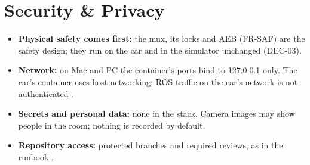 \documentclass[11pt,a4paper]{article}
\begin{document}
\section{Security \& Privacy}
\begin{itemize}
  \item \textbf{Physical safety comes first:} the mux, its locks and AEB (FR-SAF) are the safety design; they run on the car and in the simulator unchanged (DEC-03).
  \item \textbf{Network:} on Mac and PC the container's ports bind to 127.0.0.1 only. The car's container uses host networking; ROS traffic on the car's network is not authenticated \tbd.
  \item \textbf{Secrets and personal data:} none in the stack. Camera images may show people in the room; nothing is recorded by default.
  \item \textbf{Repository access:} protected branches and required reviews, as in the runbook .
\end{itemize}

\end{document}
